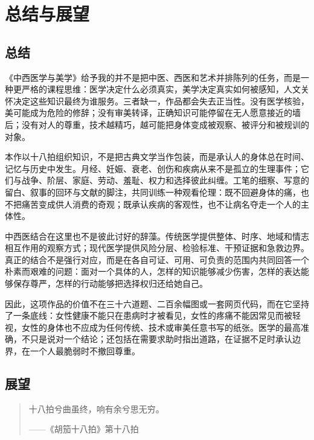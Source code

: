 \documentclass[lang=cn,a4paper,11pt,citestyle=gb7714-2015,bibstyle=gb7714-2015]{elegantpaper}
\begin{document}
\clearpage
{}%
\section{总结与展望}

\subsection{总结}

《中西医学与美学》给予我的并不是把中医、西医和艺术并排陈列的任务，而是一种更严格的课程思维：医学决定什么必须真实，美学决定真实如何被感知，人文关怀决定这些知识最终为谁服务。三者缺一，作品都会失去正当性。没有医学核验，美可能成为危险的修辞；没有审美转译，正确知识可能停留在无人愿意接近的墙后；没有对人的尊重，技术越精巧，越可能把身体变成被观察、被评分和被规训的对象。

本作以十八拍组织知识，不是把古典文学当作包装，而是承认人的身体总在时间、记忆与历史中发生。月经、妊娠、衰老、创伤和疾病从来不是孤立的生理事件；它们与战争、阶层、家庭、劳动、羞耻、权力和选择彼此纠缠。工笔的细察、写意的留白、叙事的回环与文献的脚注，共同训练一种观看伦理：既不回避身体的痛，也不把痛苦变成供人消费的奇观；既承认疾病的客观性，也不让病名夺走一个人的主体性。

中西医结合在这里也不是彼此讨好的辞藻。传统医学提供整体、时序、地域和情志相互作用的观察方式；现代医学提供风险分层、检验标准、干预证据和急救边界。真正的结合不是强行对应，而是在各自可证、可用、可负责的范围内共同回答一个朴素而艰难的问题：面对一个具体的人，怎样的知识能够减少伤害，怎样的表达能够保存尊严，怎样的行动能够把选择权归还给她自己。

因此，这项作品的价值不在三十六道题、二百余幅图或一套网页代码，而在它坚持了一条底线：女性健康不能只在患病时才被看见，女性的疼痛不能因常见而被轻视，女性的身体也不应成为任何传统、技术或审美任意书写的纸张。医学的最高准确，不只是说对一个结论；还包括在需要求助时指出道路，在证据不足时承认边界，在一个人最脆弱时不撤回尊重。

\subsection{展望}

\begin{quote}
\centering\large\kaishu
十八拍兮曲虽终，响有余兮思无穷。
\par\smallskip
\normalfont\normalsize ——《胡笳十八拍》第十八拍\cite{guo1979yuefu}
\end{quote}
\end{document}
